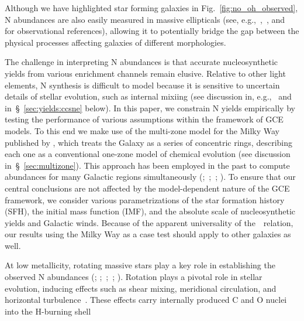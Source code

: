 \documentclass[ms.tex]{subfiles}
\begin{document}
Although we have highlighted star forming galaxies in
Fig.~\ref{fig:no_oh_observed}, N abundances are also easily measured in
massive ellipticals (see, e.g.,~\citealp{Schiavon2010},~\citealp{Conroy2013},
and~\citealp*{Conroy2014} for observational references), allowing it to
potentially bridge the gap between the physical processes affecting galaxies of
different morphologies.
\par
The challenge in interpreting N abundances is that accurate nucleosynthetic
yields from various enrichment channels remain elusive.
Relative to other light elements, N synthesis is difficult to model because it
is sensitive to uncertain details of stellar evolution, such as internal
mixiing (see discussion in, e.g.,~\citealp{Andrews2017} and
in~\S~\ref{sec:yields:ccsne} below).
In this paper, we constrain N yields empirically by testing the performance of
various assumptions within the framework of GCE models.
To this end we make use of the multi-zone model for the Milky Way published by
\citet{Johnson2021}, which treats the Galaxy as a series of concentric rings,
describing each one as a conventional one-zone model of chemical evolution
(see discussion in~\S~\ref{sec:multizone}).
This approach has been employed in the past to compute abundances for many
Galactic regions simultaneously (\citealp{Matteucci1989, Wyse1989, Prantzos1995,
Schoenrich2009};~\citealp*{Minchev2013, Minchev2014};~\citealp{Minchev2017};
\citealp*{Sharma2021}).
{\color{red}
To ensure that our central conclusions are not affected by the model-dependent
nature of the GCE framework, we consider various parametrizations of the star
formation history (SFH), the initial mass function (IMF), and the absolute
scale of nucleosynthetic yields and Galactic winds.
}%
Because of the apparent universality of the~\ohno~relation, our results using
the Milky Way as a case test should apply to other galaxies as well.
\par
At low metallicity, rotating massive stars play a key role in establishing the
observed N abundances (\citealp*{Chiappini2003, Chiappini2005};
\citealp{Chiappini2006};~\citealp*{Kobayashi2011};~\citealp{Prantzos2018};
\citealp*{Grisoni2021}).
Rotation plays a pivotal role in stellar evolution, inducing effects such as
shear mixing, meridional circulation, and horizontal turbulence~\citep{Zahn1992, 
Maeder1998, Lagarde2012}.
These effects carry internally produced C and O nuclei into the H-burning shell
\end{document}
